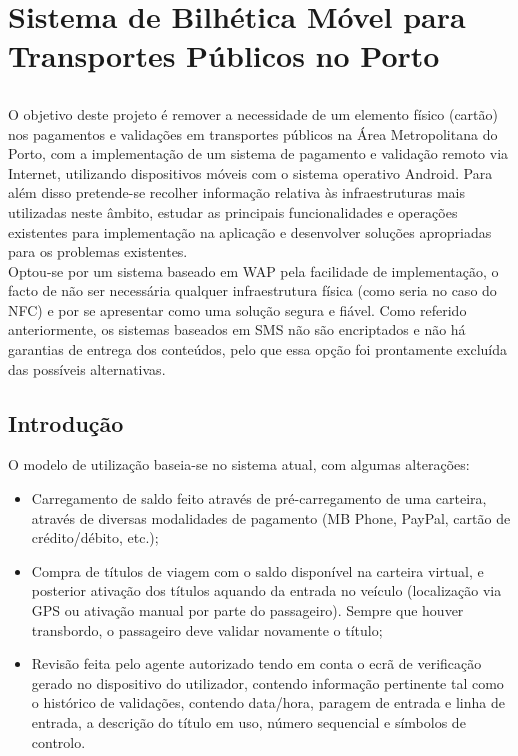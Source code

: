 \chapter{Sistema de Bilhética Móvel para Transportes Públicos no Porto}\label{chap:projeto}

\section*{}

O objetivo deste projeto é remover a necessidade de um elemento físico (cartão) nos pagamentos e validações em transportes públicos na Área Metropolitana do Porto, com a implementação de um sistema de pagamento e validação remoto via Internet, utilizando dispositivos móveis com o sistema operativo Android. Para além disso pretende-se recolher informação relativa às infraestruturas mais utilizadas neste âmbito, estudar as principais funcionalidades e operações existentes para implementação na aplicação e desenvolver soluções apropriadas para os problemas existentes.
\\Optou-se por um sistema baseado em WAP pela facilidade de implementação, o facto de não ser necessária qualquer infraestrutura física (como seria no caso do NFC) e por se apresentar como uma solução segura e fiável. Como referido anteriormente, os sistemas baseados em SMS não são encriptados e não há garantias de entrega dos conteúdos, pelo que essa opção foi prontamente excluída das possíveis alternativas.

\section{Introdução}

O modelo de utilização baseia-se no sistema atual, com algumas alterações:
\begin{itemize}
\item Carregamento de saldo feito através de pré-carregamento de uma carteira, através de diversas modalidades de pagamento (MB Phone, PayPal, cartão de crédito/débito, etc.);
\item Compra de títulos de viagem com o saldo disponível na carteira virtual, e posterior ativação dos títulos aquando da entrada no veículo (localização via GPS ou ativação manual por parte do passageiro). Sempre que houver transbordo, o passageiro deve validar novamente o título;
\item Revisão feita pelo agente autorizado tendo em conta o ecrã de verificação gerado no dispositivo do utilizador, contendo informação pertinente tal como o histórico de validações, contendo data/hora, paragem de entrada e linha de entrada, a descrição do título em uso, número sequencial e símbolos de controlo.
\end{itemize}



